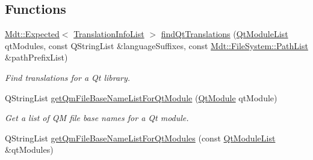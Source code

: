\subsection*{Functions}
\begin{DoxyCompactItemize}
\item 
\hyperlink{class_mdt_1_1_expected}{Mdt\+::\+Expected}$<$ \hyperlink{class_mdt_1_1_translation_1_1_translation_info_list}{Translation\+Info\+List} $>$ \hyperlink{namespace_mdt_1_1_deploy_utils_ace6bee354884bc9c507a753488cd1666}{find\+Qt\+Translations} (\hyperlink{class_mdt_1_1_deploy_utils_1_1_qt_module_list}{Qt\+Module\+List} qt\+Modules, const Q\+String\+List \&language\+Suffixes, const \hyperlink{class_mdt_1_1_file_system_1_1_path_list}{Mdt\+::\+File\+System\+::\+Path\+List} \&path\+Prefix\+List)
\begin{DoxyCompactList}\small\item\em Find translations for a Qt library. \end{DoxyCompactList}\item 
Q\+String\+List \hyperlink{namespace_mdt_1_1_deploy_utils_a3570efbd3224a9dd0453d07ef1c98654}{get\+Qm\+File\+Base\+Name\+List\+For\+Qt\+Module} (\hyperlink{namespace_mdt_1_1_deploy_utils_af64a196dd2a56ed4930253e7fb4ed591}{Qt\+Module} qt\+Module)\hypertarget{namespace_mdt_1_1_deploy_utils_a3570efbd3224a9dd0453d07ef1c98654}{}\label{namespace_mdt_1_1_deploy_utils_a3570efbd3224a9dd0453d07ef1c98654}

\begin{DoxyCompactList}\small\item\em Get a list of QM file base names for a Qt module. \end{DoxyCompactList}\item 
Q\+String\+List \hyperlink{namespace_mdt_1_1_deploy_utils_a38a2b48c2b9fc1c63a84f441eef17842}{get\+Qm\+File\+Base\+Name\+List\+For\+Qt\+Modules} (const \hyperlink{class_mdt_1_1_deploy_utils_1_1_qt_module_list}{Qt\+Module\+List} \&qt\+Modules)\hypertarget{namespace_mdt_1_1_deploy_utils_a38a2b48c2b9fc1c63a84f441eef17842}{}\label{namespace_mdt_1_1_deploy_utils_a38a2b48c2b9fc1c63a84f441eef17842}


\end{DoxyCompactItemize}
